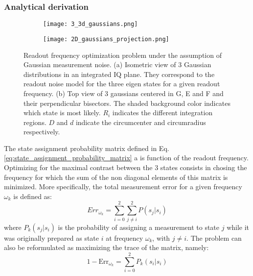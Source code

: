 \subsubsection{Analytical derivation} \label{s:analytical_derivation_3_gaussians}

\begin{figure}[htp]
  \centering
  \begin{subfigure}[t]{0.47\textwidth}
     \centering \texttt{[image: 3\_3d\_gaussians.png]}
     \caption{ }
     \label{fig:3gaussians_in_2d}
  \end{subfigure}
  \hspace{5pt}
  \begin{subfigure}[t]{0.47\textwidth}
     \centering 
     \texttt{[image: 2D\_gaussians\_projection.png]}
     \caption{ }
     \label{fig:3gaussians_top_view}
  \end{subfigure}
  \caption{Readout frequency optimization problem under the assumption of Gaussian measurement noise. (a) Isometric view of 3 Gaussian distributions in an integrated IQ plane. They correspond to the readout noise model for the three eigen states for a given readout frequency. (b) Top view of 3 gaussians centered in G, E and F and their perpendicular bisectors. The shaded background color indicates which state is most  likely. $R_i$ indicates the different integration regions.  $D$ and $d$  indicate the circumcenter and circumradius respectively. }
  \label{figure:3_gaussians}
\end{figure}

The state assignment probability matrix defined in Eq. \eqref{eq:state_assignment_probability_matrix} a is function of the readout frequency. Optimizing for the maximal contrast between the 3 states consists in chosing the frequency for which the sum of the non diagonal elements of this matrix is minimized.
More specifically, the total measurement error for a given frequency $\omega_k$ is defined as:
\begin{equation}
Err_{\omega_k}= \sum_{i=0}^{2}{\sum_{j \neq i}^{2}{P(s_j | s_i)}}
\end{equation}
where $P_k(s_j|s_i)$ is the probability of assigning a measurement to state $j$ while it was originally prepared as state $i$ at frequency $\omega_k$, with $j\neq i$. The problem can also be reformulated as maximizing the trace of the matrix, namely:
\begin{equation}
   1 - \text{Err}_{\omega_k} = \sum_{i=0}^2{P_k(s_i|s_i)}
\end{equation}

